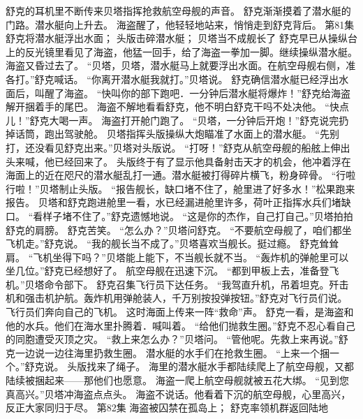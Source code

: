 \documentclass[a4paper,12pt,UTF8,twoside]{ctexbook}
\begin{document}
        舒克的耳机里不断传来贝塔指挥抢救航空母舰的声音。 
        舒克渐渐摸着了潜水艇的门路。潜水艇向上升去。 
        海盗醒了，他轻轻地站来，悄悄走到舒克背后。   第81集 
        舒克将潜水艇浮出水面； 
        头版击碎潜水艇； 
        贝塔当不成舰长了   
        舒克早已从操纵台上的反光镜里看见了海盗，他猛一回手，给了海盗一拳加一脚。继续操纵潜水艇。 
        海盗又昏过去了。 
        “贝塔，贝塔，潜水艇马上就要浮出水面。在航空母舰右侧，准各打。”舒克喊话。 
        “你离开潜水艇我就打。”贝塔说。 
        舒克确信潜水艇已经浮出水面后，叫醒了海盗。 
        “快叫你的部下跑吧．一分钟后潜水艇将爆炸！”舒克给海盗解开捆着手的尾巴。 
        海盗不解地看看舒克，他不明白舒克干吗不处决他。 
        “快点儿！”舒克大喝一声。 
        海盗打开舱门跑了。 
        “贝塔，一分钟后开炮！”舒克说完扔掉话筒，跑出驾驶舱。 
        贝塔指挥头版操纵大炮瞄准了水面上的潜水艇。 
        “先别打，还没看见舒克出来。”贝塔对头版说。 
        “打呀！”舒克从航空母舰的船舷上伸出头来喊，他已经回来了。 
        头版终于有了显示他具备射击天才的机会，他冲着浮在海面上的近在咫尺的潜水艇乱打一通。潜水艇被打得碎片横飞，粉身碎骨。 
        “行啦行啦！”贝塔制止头版。 
        “报告舰长，缺口堵不住了，舱里进了好多水！”松果跑来报告。 
        贝塔和舒克跑进舱里一看，水已经漏进舱里许多，荷叶正指挥水兵们堵缺口。 
        “看样子堵不住了。”舒克遗憾地说。 
        “这是你的杰作，自己打自己。”贝塔拍拍舒克的肩膀。 
        舒克苦笑。 
        “怎么办？”贝塔问舒克。 
        “不要航空母舰了，咱们都坐飞机走。”舒克说。 
        “我的舰长当不成了。”贝塔喜欢当舰长。挺过瘾。 
        舒克耸耸肩。 
        “飞机坐得下吗？”贝塔能上能下，不当舰长就不当。 
        “轰炸机的弹舱里可以坐几位。”舒克已经想好了。 
        航空母舰在迅速下沉。 
        “都到甲板上去，准备登飞机。”贝塔命令部下。 
        舒克召集飞行员下达任务。 
        “我驾直升机，吊着坦克。歼击机和强击机护航。轰炸机用弹舱装人，千万别按投弹按钮。”舒克对飞行员们说。 
        飞行员们奔向自己的飞机。 
        这时海面上传来一阵“救命”声。 
        舒克一看，是海盗和他的水兵。他们在海水里扑腾着．喊叫着。 
        “给他们抛救生圈。”舒克不忍心看自己的同胞遭受灭顶之灾。 
        “救上来怎么办？”贝塔问。 
        “管他呢。先救上来再说。”舒克一边说一边往海里扔救生圈。 
        潜水艇的水手们在抢救生圈。 
        “上来一个捆一个。”舒克说。 
       头版找来了绳子。 
       海里的潜水艇水手都陆续爬上了航空母舰，又都陆续被捆起来——那他们也愿意。 
        海盗一爬上航空母舰就被五花大绑。 
        “见到您真高兴。”贝塔冲海盗点点头。 
        海盗不说话。他看着下沉的航空母舰，心里高兴，反正大家同归于尽。   第82集 
        海盗被囚禁在孤岛上； 
        舒克率领机群返回陆地   
\end{document}
